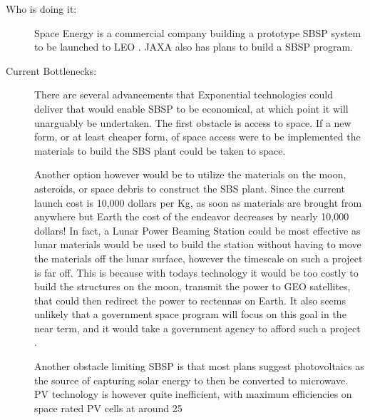 \begin{description}
\item[Who is doing it:] Space  Energy is a commercial company building a prototype SBSP system to be  launched to LEO  \cite{SpaceEnergy2010}. JAXA also has plans to build a SBSP  program.
 
\item[Current Bottlenecks:] There  are several advancements that Exponential technologies could deliver  that would enable SBSP to be economical, at which point it will  unarguably be undertaken. The first obstacle is access to space. If a  new form, or at least cheaper form, of space access were to be  implemented the materials to build the SBS plant could be taken to  space.
 
Another option however would be to  utilize the materials on the moon, asteroids, or space debris to  construct the SBS plant. Since the current launch cost is 10,000 dollars  per Kg, as soon as materials are brought from anywhere but Earth the  cost of the endeavor decreases by nearly 10,000 dollars! In fact, a  Lunar Power Beaming Station could be most effective as lunar materials  would be used to build the station without having to move the materials  off the lunar surface, however the timescale on such a project is far  off. This is because with todays technology it would be too costly to  build the structures on the moon, transmit the power to GEO satellites,  that could then redirect the power to rectennas on Earth. It also seems  unlikely that a government space program will focus on this goal in the  near term, and it would take a government agency to afford such a  project \cite{Seboldt2004}.
 
Another obstacle limiting SBSP is  that most plans suggest photovoltaics as the source of capturing solar  energy to then be converted to microwave. \gls{PV} technology is however quite  inefficient, with maximum efficiencies on space rated \gls{PV} cells at  around 25%
 
\end{description}


